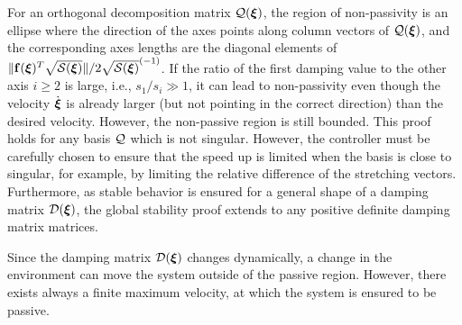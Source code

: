 For an orthogonal decomposition matrix $\mathcal{Q}(\boldsymbol{{\boldsymbol{\xi}}})$, the region of non-passivity is an ellipse where the direction of the axes points along column vectors of $\mathcal{Q}({\boldsymbol{\xi}})$, and the corresponding axes lengths are the diagonal elements of $\| \mathbf{f}({\boldsymbol{\xi}})^T \sqrt{\mathcal{S}({\boldsymbol{\xi}})}\| / 2 \sqrt{\mathcal{S}({\boldsymbol{\xi}})}^{(-1)}$. 
If the ratio of the first damping value to the other axis $i \geq 2$ is large, i.e., $s_1 / s_i \gg 1$, it can lead to non-passivity even though the velocity $\dot{\boldsymbol{\xi}}$ is already larger (but not pointing in the correct direction) than the desired velocity. However, the non-passive region is still bounded.
This proof holds for any basis $\mathcal{Q}$ which is not singular. However, the controller must be carefully chosen to ensure that the speed up is limited when the basis is close to singular, for example, by limiting the relative difference of the stretching vectors. Furthermore, as stable behavior is ensured for a general shape of a damping matrix $\mathcal{D}(\boldsymbol{\xi})$, the global stability proof extends to any positive definite damping matrix matrices.

Since the damping matrix $\mathcal{D}(\boldsymbol{\xi})$ changes dynamically, a change in the environment can move the system outside of the passive region. However, there exists always a finite maximum velocity, at which the system is ensured to be passive.

